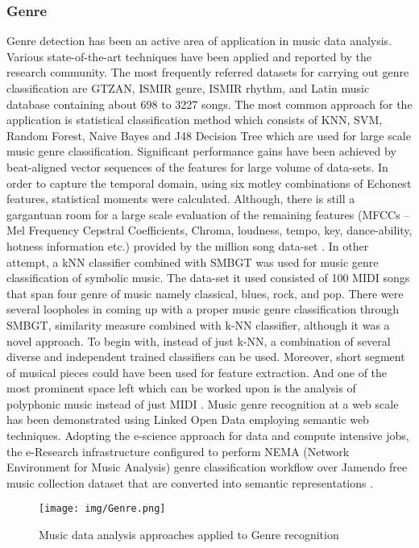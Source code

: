 \documentclass{proc}
\begin{document}
\subsubsection{Genre}
Genre detection has been an active area of application in music data analysis. Various state-of-the-art techniques have been applied and reported by the research community. The most frequently referred datasets for carrying out genre classification are GTZAN, ISMIR genre, ISMIR rhythm, and Latin music database containing about 698 to 3227 songs. The most common approach for the application is statistical classification method which consists of KNN, SVM, Random Forest, Naive Bayes and J48 Decision Tree which are used for large scale music genre classification. Significant performance gains have been achieved by beat-aligned vector sequences of the features for large volume of data-sets. In order to capture the temporal domain, using six motley combinations of Echonest features, statistical moments were calculated. Although, there is still a gargantuan room for a large scale evaluation of the remaining features (MFCCs – Mel Frequency Cepstral Coefficients, Chroma, loudness, tempo, key, dance-ability, hotness information etc.) provided by the million song data-set \cite{Schindler2012}. In other attempt, a kNN classifier combined with SMBGT was used for music genre classification of symbolic music. The data-set it used consisted of 100 MIDI songs that span four genre of music namely classical, blues, rock, and pop. There were several loopholes in coming up with a proper music genre classification through SMBGT, similarity measure combined with k-NN classifier, although it was a novel approach. To begin with, instead of just k-NN, a combination of several diverse and independent trained classifiers can be used. Moreover, short segment of musical pieces could have been used for feature extraction. And one of the most prominent space left which can be worked upon is the analysis of polyphonic music instead of just MIDI \cite{Kotsifakos2013}. Music genre recognition at a web scale has been demonstrated using Linked Open Data employing semantic web techniques. Adopting the e-science approach for data and compute intensive jobs, the e-Research infrastructure configured to perform NEMA (Network Environment for Music Analysis) genre classification workflow over Jamendo free music collection dataset that are converted into semantic representations \cite{DeRoure2011}.
\begin{figure}
	\centering
		\texttt{[image: img/Genre.png]}
	\caption{Music data analysis approaches applied to Genre recognition}
	\label{fig:Genre}
\end{figure}
\end{document}
